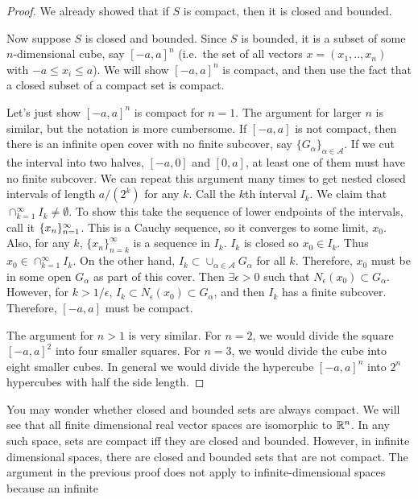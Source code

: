 \begin{proof}
  We already showed that if $S$ is compact, then it is closed and
  bounded. 

  Now suppose $S$ is closed and bounded. Since $S$ is bounded, it is a
  subset of some $n$-dimensional cube, say $[-a,a]^n$ (i.e.\ the set
  of all vectors $x = (x_1,..,x_n)$ with $-a \leq x_i \leq a$).  We
  will show $[-a,a]^n$ is compact, and then use the fact that a
  closed subset of a compact set is compact.

  Let's just show $[-a,a]^n$ is compact for $n=1$. The argument for
  larger $n$ is similar, but the notation is more cumbersome. If
  $[-a,a]$ is not compact, then there is an infinite open cover with
  no finite subcover, say $\{G_\alpha\}_{\alpha \in \mathcal{A}}$. If
  we cut the interval into two halves, $[-a,0]$ and $[0,a]$, at least
  one of them must have no finite subcover. We can repeat this
  argument many times to get nested closed intervals of length
  $a/(2^k)$ for any $k$. Call the $k$th interval $I_k$. We claim that
  $\cap_{k=1}^\infty I_k \neq \emptyset$. To show this take the
  sequence of lower endpoints of the intervals, call it
  $\{{x}_n \}_{n=1}^\infty$. This is a Cauchy sequence, so it converges to some limit,
  $x_0$. Also, for any $k$, $\{x_n\}_{n=k}^\infty$ is a sequence in
  $I_k$. $I_k$ is closed so $x_0 \in I_k$. Thus $x_0 \in
  \cap_{k=1}^\infty I_k$. On the other hand, $I_k \subset \cup_{\alpha
    \in \mathcal{A}} G_\alpha$ for all $k$. Therefore, $x_0$ must be
  in some open $G_\alpha$ as part of this cover. Then $\exists
  \epsilon>0$ such that $N_\epsilon(x_0) \subset G_\alpha$. However,
  for $k>1/\epsilon$, $I_k \subset N_\epsilon(x_0) \subset G_\alpha$,
  and then $I_k$ has a finite subcover. Therefore, $[-a,a]$ must be
  compact. 

  The argument for $n>1$ is very similar. For $n=2$, we would divide
  the square $[-a,a]^2$ into four smaller squares. For $n=3$, we would
  divide the cube into eight smaller cubes. In general we would divide
  the hypercube $[-a,a]^n$ into $2^n$ hypercubes with half the side
  length.
\end{proof}
You may wonder whether closed and bounded sets are always compact. We
will see that all finite dimensional real vector spaces are isomorphic
to $\mathbb{R}^n$. In any such space, sets are compact iff they are closed and
bounded. However, in infinite dimensional spaces, there are closed and
bounded sets that are not compact. The argument in the previous proof
does not apply to infinite-dimensional spaces because an infinite
